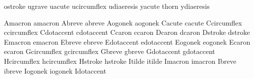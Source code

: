  ostroke       {}
 ugrave        {}
 uacute        {}
 ucircumflex   {}
 udiaeresis    {}
 yacute        {}
 thorn         {}
 ydiaeresis    {}

 Amacron       {}
 amacron       {}
 Abreve        {}
 abreve        {}
 Aogonek       {}
 aogonek       {}
 Cacute        {}
 cacute        {}
 Ccircumflex   {}
 ccircumflex   {}
 Cdotaccent    {}
 cdotaccent    {}
 Ccaron        {}
 ccaron        {}
 Dcaron        {}
 dcaron        {}
 Dstroke       {}
 dstroke       {}
 Emacron       {}
 emacron       {}
 Ebreve        {}
 ebreve        {}
 Edotaccent    {}
 edotaccent    {}
 Eogonek       {}
 eogonek       {}
 Ecaron        {}
 ecaron        {}
 Gcircumflex   {}
 gcircumflex   {}
 Gbreve        {}
 gbreve        {}
 Gdotaccent    {}
 gdotaccent    {}
 Hcircumflex   {}
 hcircumflex   {}
 Hstroke       {}
 hstroke       {}
 Itilde        {}
 itilde        {}
 Imacron       {}
 imacron       {}
 Ibreve        {}
 ibreve        {}
 Iogonek       {}
 iogonek       {}
 Idotaccent    {}
